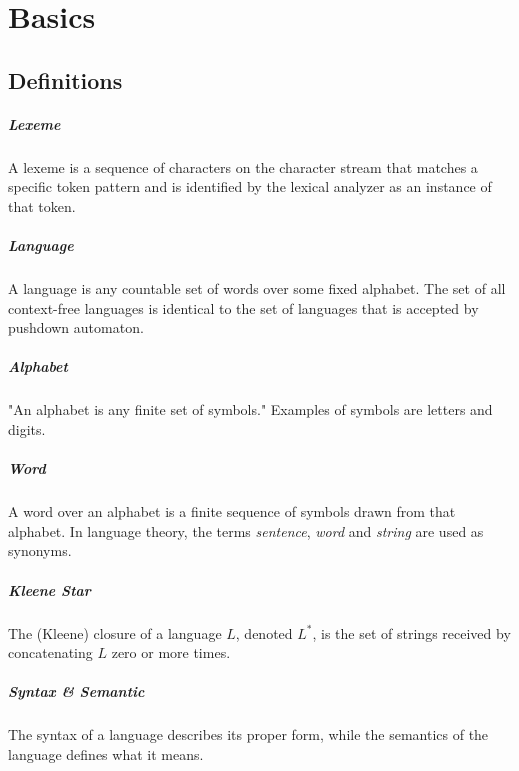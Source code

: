 \chapter{Basics}
\label{cha:basics}
\section{Definitions}

\paragraph{Lexeme}
A lexeme is a sequence of characters on the character stream that matches a specific token pattern and is identified by the lexical analyzer as an instance of that token. \cite{DragonBook}

\paragraph{Language} 
A language is any countable set of words over some fixed alphabet. The set of all context-free languages is identical to the set of languages that is accepted by pushdown automaton. \cite{DragonBook}

\paragraph{Alphabet}
"An alphabet is any finite set of symbols." Examples of symbols are letters and digits. \cite{DragonBook}

\paragraph{Word} 
A word over an alphabet is a finite sequence of symbols drawn from that alphabet. In language theory, the terms \emph{sentence}, \emph{word} and \emph{string} are used as synonyms. \cite{DragonBook}

\paragraph{Kleene Star} 
The (Kleene) closure of a language $L$, denoted $L^*$, is the set of strings received by concatenating $L$ zero or more times. \cite{DragonBook}


\paragraph{Syntax \& Semantic}  
The syntax of a language describes its proper form, while the semantics of the language defines what it means. \cite{DragonBook}


